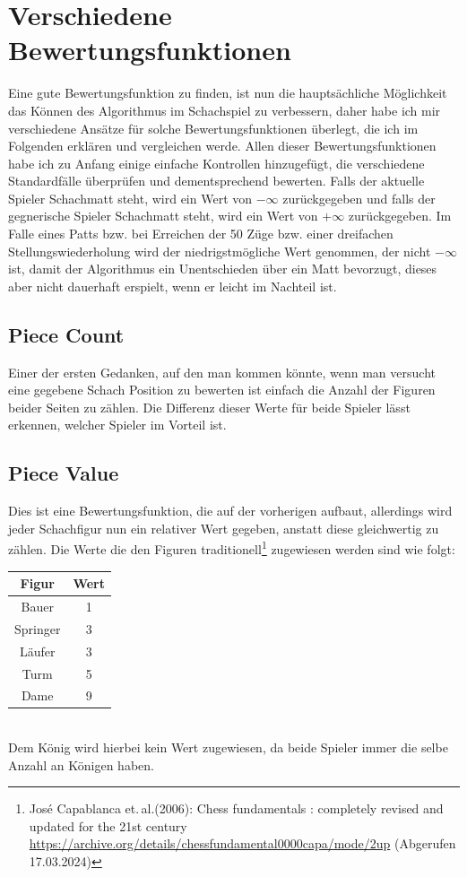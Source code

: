 \documentclass[12pt, a4paper, oneside, openright]{article}
\newcommand \bzw{bzw.\xspace }
\newcommand \etal{et.\,al.\xspace }
\begin{document}
\section{Verschiedene Bewertungsfunktionen}\label{sec:verschiedene-bewertungsfunktionen}
Eine gute Bewertungsfunktion zu finden, ist nun die hauptsächliche Möglichkeit das Können des Algorithmus im Schachspiel zu verbessern, daher habe ich mir verschiedene Ansätze für solche Bewertungsfunktionen überlegt, die ich im Folgenden erklären und vergleichen werde.
Allen dieser Bewertungsfunktionen habe ich zu Anfang einige einfache Kontrollen hinzugefügt, die verschiedene Standardfälle überprüfen und dementsprechend bewerten.
Falls der aktuelle Spieler Schachmatt steht, wird ein Wert von $ - \infty $ zurückgegeben und falls der gegnerische Spieler Schachmatt steht, wird ein Wert von $+\infty$ zurückgegeben.
Im Falle eines Patts \bzw bei Erreichen der 50 Züge \bzw einer dreifachen Stellungswiederholung wird der niedrigstmögliche Wert genommen, der nicht $ - \infty$ ist, damit der Algorithmus ein Unentschieden über ein Matt bevorzugt, dieses aber nicht dauerhaft erspielt, wenn er leicht im Nachteil ist.
\subsection{Piece Count}\label{subsec:piece-count}
Einer der ersten Gedanken, auf den man kommen könnte, wenn man versucht eine gegebene Schach Position zu bewerten ist einfach die Anzahl der Figuren beider Seiten zu zählen.
Die Differenz dieser Werte für beide Spieler lässt erkennen, welcher Spieler im Vorteil ist.
\subsection{Piece Value}\label{subsec:piece-value}
Dies ist eine Bewertungsfunktion, die auf der vorherigen aufbaut, allerdings wird jeder Schachfigur nun ein relativer Wert gegeben, anstatt diese gleichwertig zu zählen.
Die Werte die den Figuren traditionell\footnote{José Capablanca \etal (2006): Chess fundamentals : completely revised and updated for the 21st century \url{https://archive.org/details/chessfundamental0000capa/mode/2up} (Abgerufen 17.03.2024)} zugewiesen werden sind wie folgt:
\begin{table}[h!]
    \centering
    \begin{tabular}{||c c ||}
        \hline
        Figur & Wert \\ [0.5ex]
        \hline\hline
        Bauer & 1 \\
        \hline
        Springer & 3 \\
        \hline
        Läufer & 3 \\
        \hline
        Turm & 5 \\
        \hline
        Dame & 9 \\
        \hline
    \end{tabular}
\end{table}\label{tab:Piece Values} \\
Dem König wird hierbei kein Wert zugewiesen, da beide Spieler immer die selbe Anzahl an Königen haben.
\end{document}
